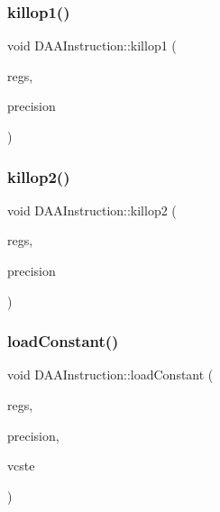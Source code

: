 \mbox{\label{classDAAInstruction_a5777e370fcddd3fcee56292a0b11ce76}} 
\subsubsection{\texorpdfstring{killop1()}{killop1()}}
{\footnotesize\ttfamily void D\+A\+A\+Instruction\+::killop1 (\begin{DoxyParamCaption}\item[{\hyperlink{DAAInstruction_8h_af0fae93a861de9cf37988d5673cac523}{reg\+Table} \&}]{regs,  }\item[{vector$<$ bool $>$ \&}]{precision }\end{DoxyParamCaption})}

\mbox{\label{classDAAInstruction_af578262b493bcef395ca2a3013dc8f0c}} 
\subsubsection{\texorpdfstring{killop2()}{killop2()}}
{\footnotesize\ttfamily void D\+A\+A\+Instruction\+::killop2 (\begin{DoxyParamCaption}\item[{\hyperlink{DAAInstruction_8h_af0fae93a861de9cf37988d5673cac523}{reg\+Table} \&}]{regs,  }\item[{vector$<$ bool $>$ \&}]{precision }\end{DoxyParamCaption})}

\mbox{\label{classDAAInstruction_add9aa31194d56406bd69063a440aef87}} 
\subsubsection{\texorpdfstring{load\+Constant()}{loadConstant()}}
{\footnotesize\ttfamily void D\+A\+A\+Instruction\+::load\+Constant (\begin{DoxyParamCaption}\item[{\hyperlink{DAAInstruction_8h_af0fae93a861de9cf37988d5673cac523}{reg\+Table} \&}]{regs,  }\item[{\hyperlink{DAAInstruction_8h_a0e8cae02815a5f8adc750122d790b455}{reg\+Precision\+Table} \&}]{precision,  }\item[{string}]{vcste }\end{DoxyParamCaption})}


